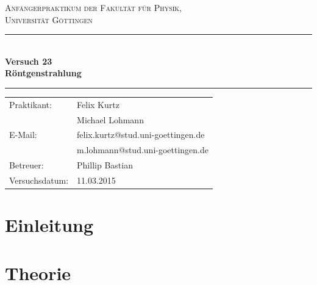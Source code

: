 \documentclass[12pt,a4paper,titlepage,headinclude,bibtotoc]{scrartcl}
\begin{document}
\begin{titlepage}
\centering
\textsc{\Large Anfängerpraktikum der Fakultät für
  Physik,\\[1.5ex] Universität Göttingen}

\vspace*{4.2cm}

\rule{\textwidth}{1pt}\\[0.5cm]
{\huge \bfseries
  Versuch 23\\[1.5ex]
  Röntgenstrahlung}\\[0.5cm]
\rule{\textwidth}{1pt}

\vspace*{3.0cm}

\begin{Large}
\begin{tabular}{ll}
Praktikant:
 	&  Felix Kurtz\\
 	&  Michael Lohmann\\

E-Mail: 
	&  felix.kurtz@stud.uni-goettingen.de\\
	& m.lohmann@stud.uni-goettingen.de\\

 Betreuer: & Phillip Bastian\\
 Versuchsdatum: &  11.03.2015\\
\end{tabular}
\end{Large}

\vspace*{0.8cm}

\begin{Large}
\end{Large}

\end{titlepage}

\tableofcontents

\newpage

\section{Einleitung}
\label{sec:einleitung}

\section{Theorie}
\label{sec:theorie}
\end{document}
